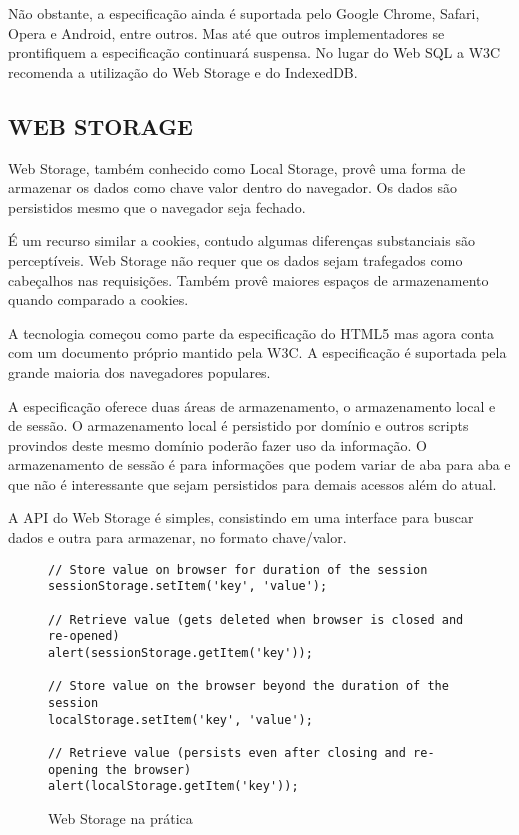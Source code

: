 Não obstante, a especificação ainda é suportada pelo Google
Chrome, Safari, Opera e Android, entre outros. Mas até que outros
implementadores se prontifiquem a especificação continuará suspensa.
No lugar do Web SQL a W3C recomenda a utilização do Web Storage e do
IndexedDB.

\subsection{WEB STORAGE}

Web Storage, também conhecido como Local Storage, provê uma forma de
armazenar os dados como chave valor dentro do navegador. Os dados são
persistidos mesmo que o navegador seja fechado.

É um recurso similar a cookies, contudo algumas diferenças
substanciais são perceptíveis. Web Storage não requer que os dados
sejam trafegados como cabeçalhos nas requisições. Também provê
maiores espaços de armazenamento quando comparado a cookies.

A tecnologia começou como parte da especificação do HTML5 mas agora
conta com um documento próprio mantido pela W3C. A especificação é
suportada pela grande maioria dos navegadores populares.

A especificação oferece duas áreas de armazenamento, o armazenamento
local e de sessão. O armazenamento local é persistido por domínio
e outros scripts provindos deste mesmo domínio poderão fazer uso da
informação. O armazenamento de sessão é para informações que podem
variar de aba para aba e que não é interessante que sejam persistidos
para demais acessos além do atual.

A API do Web Storage é simples, consistindo em uma interface para
buscar dados e outra para armazenar, no formato chave/valor.

\begin{figure}
\centering
\begin{verbatim}
// Store value on browser for duration of the session
sessionStorage.setItem('key', 'value');

// Retrieve value (gets deleted when browser is closed and re-opened)
alert(sessionStorage.getItem('key'));

// Store value on the browser beyond the duration of the session
localStorage.setItem('key', 'value');

// Retrieve value (persists even after closing and re-opening the browser)
alert(localStorage.getItem('key'));

\end{verbatim}
\caption{Web Storage na prática}
\label{fig:WebStorage}
\end{figure}

